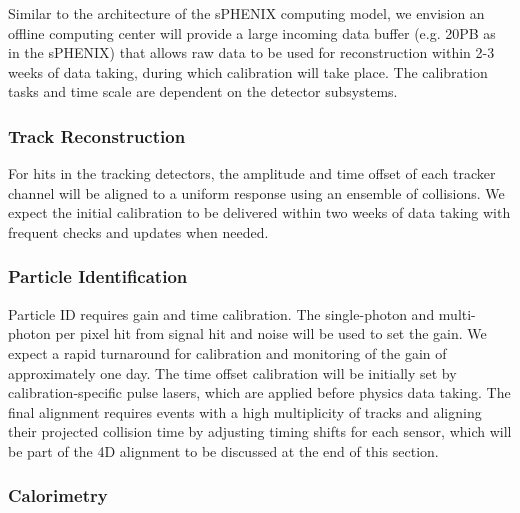 Similar to the architecture of the sPHENIX computing model, we envision an offline computing center will provide a large incoming data buffer (e.g. 20PB as in the sPHENIX) that allows raw data to be used for reconstruction within 2-3 weeks of data taking, during which calibration will take place. The calibration tasks and time scale are dependent on the detector subsystems.

\subsubsection{Track Reconstruction}

For hits in the tracking detectors, the amplitude and time offset of each tracker channel will be aligned to a uniform response using an ensemble of collisions. We expect the initial calibration to be delivered within two weeks of data taking with frequent checks and updates when needed. 

\subsubsection{Particle Identification}

 Particle ID requires gain and time calibration. The single-photon and multi-photon per pixel hit from signal hit and noise will be used to set the gain. We expect a rapid turnaround for calibration and monitoring of the gain of approximately one day. The time offset calibration will be initially set by calibration-specific pulse lasers, which are applied before physics data taking. The final alignment requires events with a high multiplicity of tracks and aligning their projected collision time by adjusting timing shifts for each sensor, which will be part of the 4D alignment to be discussed at the end of this section.

 
 \subsubsection{Calorimetry}
 
